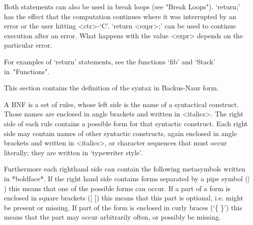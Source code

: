 {Both statements can also be used in break loops (see "Break Loops").
`return;' has the effect that the computation continues where it was
interrupted by an error or the user hitting <ctr>-`C'.  `return <expr>;'
can be used to continue execution after an error. What happens with the
value <expr> depends on the particular error.

For examples of `return' statements, see the functions `fib' and `Stack'
in~"Functions".



This section contains the definition  of the {\GAP} syntax in Backus-Naur
form.

A  BNF is a set of rules, whose left side  is the name of  a  syntactical
construct.  Those  names  are enclosed in angle  brackets and  written in
<italics>.  The right side of each rule contains a possible form for that
syntactic  construct.   Each  right  side  may  contain  names  of  other
syntactic  constructs,  again  enclosed in angle brackets and written  in
<italics>,  or character  sequences that  must  occur literally; they are
written in `typewriter style'.

Furthermore  each righthand side  can contain  the  following metasymbols
written in *boldface*.  If the right  hand  side contains forms separated
by a pipe symbol  ($|$)  this means  that one  of the possible forms can
occur.  If a part of a form  is enclosed  in square brackets  ([ ])  this
means that this part is optional, i.e.  might be present or  missing.  If
part  of the form is enclosed  in curly braces  (`\{  \}')  this means that
the part may occur arbitrarily often, or possibly be missing.

}

